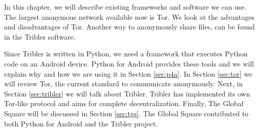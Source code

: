 In this chapter, we will describe existing frameworks and software we can use. The largest anonymous network available now is Tor. We look at the advantages and disadvantages of Tor. Another way to anonymously share files, can be found in the Tribler software.
	
Since Tribler is written in Python, we need a framework that executes Python code on an Android device. Python for Android provides these tools and we will explain why and how we are using it in Section \ref{sec:p4a}. In Section \ref{sec:tor} we will review Tor, the current standard to communicate anonymously. Next, in Section \ref{sec:tribler} we will talk about Tribler. Tribler has implemented its own Tor-like protocol and aims for complete decentralization. Finally, The Global Square will be discussed in Section \ref{sec:tgs}. The Global Square contributed to both Python for Android and the Tribler project.
